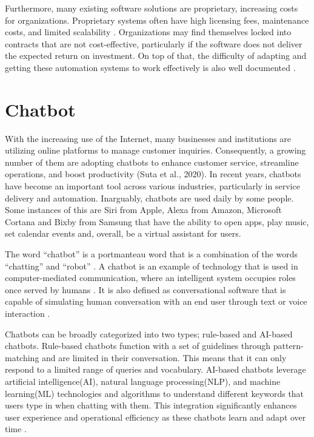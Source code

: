 Furthermore, many existing software solutions are proprietary, increasing costs for organizations. Proprietary systems often have high licensing fees, maintenance costs, and limited scalability \cite{goel2012, prasad2013}. Organizations may find themselves locked into contracts that are not cost-effective, particularly if the software does not deliver the expected return on investment. On top of that, the difficulty of adapting and getting these automation systems to work effectively is also well documented \cite{adams2011, sarker2003, scott2000}.


\section{Chatbot}

With the increasing use of the Internet, many businesses and institutions are utilizing online platforms to manage customer inquiries. Consequently, a growing number of them are adopting chatbots to enhance customer service, streamline operations, and boost productivity (Suta et al., 2020). In recent years, chatbots have become an important tool across various industries, particularly in service delivery and automation. Inarguably, chatbots are used daily by some people. Some instances of this are Siri from Apple, Alexa from Amazon, Microsoft Cortana and Bixby from Samsung that have the ability to open apps, play music, set calendar events and, overall, be a virtual assistant for users.

The word “chatbot” is a portmanteau word that is a combination of the words “chatting” and “robot” \cite{rese2020}. A chatbot is an example of technology that is used in computer-mediated communication, where an intelligent system occupies roles once served by humans \cite{beattie2020}. It is also defined as conversational software that is capable of simulating human conversation with an end user through text or voice interaction \cite{Naruzzaman}.

Chatbots can be broadly categorized into two types; rule-based and AI-based chatbots. Rule-based chatbots function with a set of guidelines through pattern-matching and are limited in their conversation. This means that it can only respond to a limited range of queries and vocabulary. AI-based chatbots leverage artificial intelligence(AI), natural language processing(NLP), and machine learning(ML) technologies and algorithms to understand different keywords that users type in when chatting with them. This integration significantly enhances user experience and operational efficiency as these chatbots learn and adapt over time \cite{Kar2016}.

